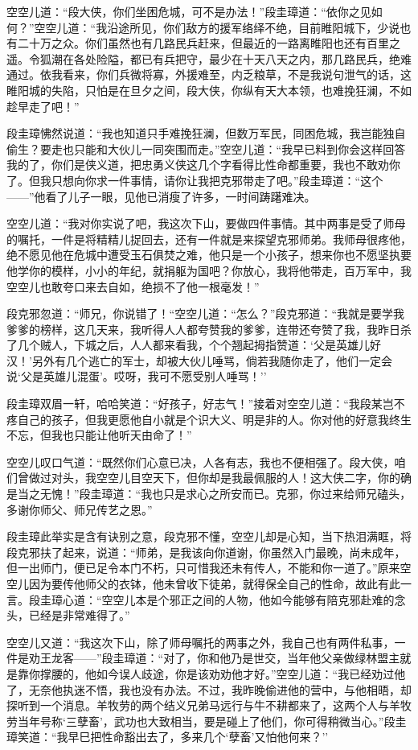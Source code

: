 \documentclass[12pt,oneside]{book}
\begin{document}
空空儿道：``段大侠，你们坐困危城，可不是办法！''段圭璋道：``依你之见如何？''空空儿道：``我沿途所见，你们敌方的援军络绎不绝，目前睢阳城下，少说也有二十万之众。你们虽然也有几路民兵赶来，但最近的一路离睢阳也还有百里之遥。令狐潮在各处险隘，都已有兵把守，最少在十天八天之内，那几路民兵，绝难通过。依我看来，你们兵微将寡，外援难至，内乏粮草，不是我说句泄气的话，这睢阳城的失陷，只怕是在旦夕之间，段大侠，你纵有天大本领，也难挽狂澜，不如趁早走了吧！''

段圭璋怫然说道：``我也知道只手难挽狂澜，但数万军民，同困危城，我岂能独自偷生？要走也只能和大伙儿一同突围而走。''空空儿道：``我早已料到你会这样回答我的了，你们是侠义道，把忠勇义侠这几个字看得比性命都重要，我也不敢劝你了。但我只想向你求一件事情，请你让我把克邪带走了吧。''段圭璋道：``这个------''他看了儿子一眼，见他已消瘦了许多，一时间踌躇难决。

空空儿道：``我对你实说了吧，我这次下山，要做四件事情。其中两事是受了师母的嘱托，一件是将精精儿捉回去，还有一件就是来探望克邪师弟。我师母很疼他，绝不愿见他在危城中遭受玉石俱焚之难，他只是一个小孩子，想来你也不愿坚执要他学你的模样，小小的年纪，就捐躯为国吧？你放心，我将他带走，百万军中，我空空儿也敢夸口来去自如，绝损不了他一根毫发！''

段克邪忽道：``师兄，你说错了！``空空儿道：``怎么？''段克邪道：``我就是要学我爹爹的榜样，这几天来，我听得人人都夸赞我的爹爹，连带还夸赞了我，我昨日杀了几个贼人，下城之后，人人都来看我，个个翘起拇指赞道：`父是英雄儿好汉！'另外有几个逃亡的军士，却被大伙儿唾骂，倘若我随你走了，他们一定会说`父是英雄儿混蛋'。哎呀，我可不愿受别人唾骂！''

段圭璋双眉一轩，哈哈笑道：``好孩子，好志气！''接着对空空儿道：``我段某岂不疼自己的孩子，但我更愿他自小就是个识大义、明是非的人。你对他的好意我终生不忘，但我也只能让他听天由命了！''

空空儿叹口气道：``既然你们心意已决，人各有志，我也不便相强了。段大侠，咱们曾做过对头，我空空儿目空天下，但你却是我最佩服的人！这大侠二字，你的确是当之无愧！''段圭璋道：``我也只是求心之所安而已。克邪，你过来给师兄磕头，多谢你师父、师兄传艺之恩。''

段圭璋此举实是含有诀别之意，段克邪不懂，空空儿却是心知，当下热泪满眶，将段克邪扶了起来，说道：``师弟，是我该向你道谢，你虽然入门最晚，尚未成年，但一出师门，便已足令本门不朽，只可惜我还未有传人，不能和你一道了。''原来空空儿因为要传他师父的衣钵，他未曾收下徒弟，就得保全自己的性命，故此有此一言。段圭璋心道：``空空儿本是个邪正之间的人物，他如今能够有陪克邪赴难的念头，已经是非常难得了。''

空空儿又道：``我这次下山，除了师母嘱托的两事之外，我自己也有两件私事，一件是劝王龙客------''段圭璋道：``对了，你和他乃是世交，当年他父亲做绿林盟主就是靠你撑腰的，他如今误人歧途，你是该劝劝他才好。''空空儿道：``我已经劝过他了，无奈他执迷不悟，我也没有办法。不过，我昨晚偷进他的营中，与他相晤，却探听到一个消息。羊牧劳的两个结义兄弟马远行与牛不耕都来了，这两个人与羊牧劳当年号称`三孽畜'，武功也大致相当，要是碰上了他们，你可得稍微当心。''段圭璋笑道：``我早巳把性命豁出去了，多来几个`孽畜'又怕他何来？''
\end{document}
